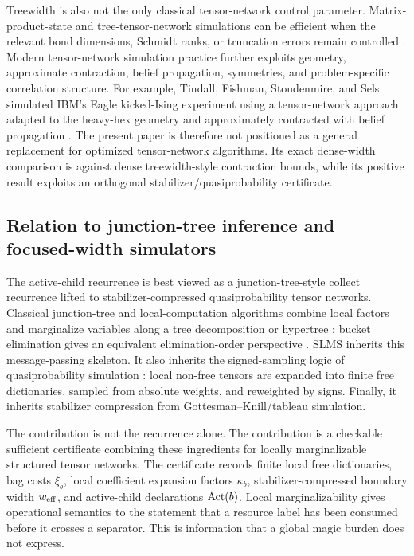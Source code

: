 Treewidth is also not the only classical tensor-network control parameter. Matrix-product-state and tree-tensor-network simulations can be efficient when the relevant bond dimensions, Schmidt ranks, or truncation errors remain controlled \citep{Vidal2003,Schollwoeck2011}. Modern tensor-network simulation practice further exploits geometry, approximate contraction, belief propagation, symmetries, and problem-specific correlation structure. For example, Tindall, Fishman, Stoudenmire, and Sels simulated IBM's Eagle kicked-Ising experiment using a tensor-network approach adapted to the heavy-hex geometry and approximately contracted with belief propagation \citep{TindallEtAl2024}. The present paper is therefore not positioned as a general replacement for optimized tensor-network algorithms. Its exact dense-width comparison is against dense treewidth-style contraction bounds, while its positive result exploits an orthogonal stabilizer/quasiprobability certificate.

\subsection{Relation to junction-tree inference and focused-width simulators}

The active-child recurrence is best viewed as a junction-tree-style collect recurrence lifted to stabilizer-compressed quasiprobability tensor networks. Classical junction-tree and local-computation algorithms combine local factors and marginalize variables along a tree decomposition or hypertree \citep{LauritzenSpiegelhalter1988,ShaferShenoy1990}; bucket elimination gives an equivalent elimination-order perspective \citep{Dechter1999}. SLMS inherits this message-passing skeleton. It also inherits the signed-sampling logic of quasiprobability simulation \citep{PashayanWallmanBartlett2015,PashayanBartlettGross2020}: local non-free tensors are expanded into finite free dictionaries, sampled from absolute weights, and reweighted by signs. Finally, it inherits stabilizer compression from Gottesman--Knill/tableau simulation.

The contribution is not the recurrence alone. The contribution is a checkable sufficient certificate combining these ingredients for locally marginalizable structured tensor networks. The certificate records finite local free dictionaries, bag costs \(\xi_b\), local coefficient expansion factors \(\kappa_b\), stabilizer-compressed boundary width \(w_{\mathrm{eff}}\), and active-child declarations \(\operatorname{Act}(b)\). Local marginalizability gives operational semantics to the statement that a resource label has been consumed before it crosses a separator. This is information that a global magic burden does not express.

